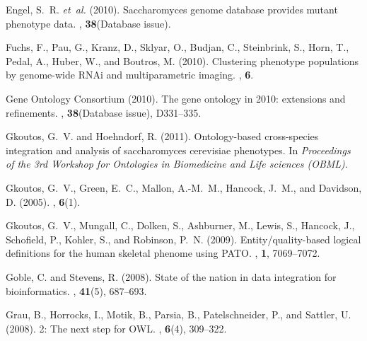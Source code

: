 \documentclass{bioinfo}
\begin{document}
\begin{thebibliography}{}
Engel, S.~R. {\em et~al.} (2010).
\newblock Saccharomyces genome database provides mutant phenotype data.
, {\bf 38}(Database issue).

Fuchs, F., Pau, G., Kranz, D., Sklyar, O., Budjan, C., Steinbrink, S., Horn,
  T., Pedal, A., Huber, W., and Boutros, M. (2010).
\newblock Clustering phenotype populations by genome-wide {RNAi} and
  multiparametric imaging.
, {\bf 6}.

{Gene Ontology Consortium} (2010).
\newblock The gene ontology in 2010: extensions and refinements.
, {\bf 38}(Database issue), D331--335.

Gkoutos, G.~V. and Hoehndorf, R. (2011).
\newblock Ontology-based cross-species integration and analysis of
  saccharomyces cerevisiae phenotypes.
\newblock In {\em Proceedings of the 3rd Workshop for Ontologies in Biomedicine
  and Life sciences (OBML)\/}.

Gkoutos, G.~V., Green, E.~C., Mallon, A.-M.~M., Hancock, J.~M., and Davidson,
  D. (2005).
, {\bf 6}(1).

Gkoutos, G.~V., Mungall, C., Dolken, S., Ashburner, M., Lewis, S., Hancock, J.,
  Schofield, P., Kohler, S., and Robinson, P.~N. (2009).
\newblock Entity/quality-based logical definitions for the human skeletal
  phenome using {PATO}.
, {\bf 1}, 7069--7072.

Goble, C. and Stevens, R. (2008).
\newblock State of the nation in data integration for bioinformatics.
, {\bf 41}(5), 687--693.

Grau, B., Horrocks, I., Motik, B., Parsia, B., Patelschneider, P., and Sattler,
  U. (2008).
 2: The next step for {OWL}.
, {\bf 6}(4), 309--322.


\end{thebibliography}
\end{document}
